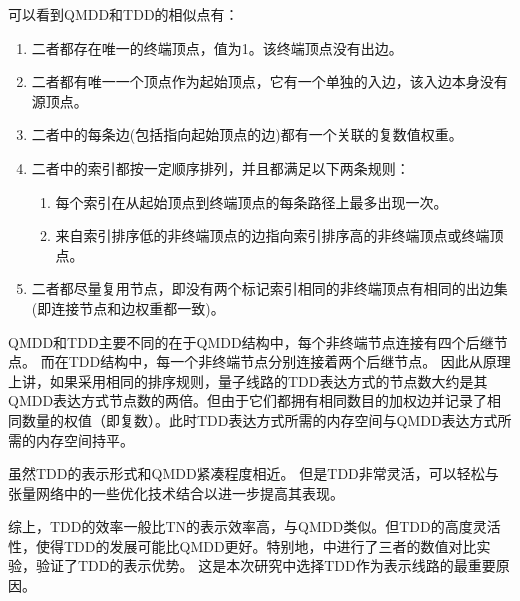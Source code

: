 可以看到QMDD和TDD的相似点有：
\begin{enumerate}
    \item 二者都存在唯一的终端顶点，值为1。该终端顶点没有出边。
    \item 二者都有唯一一个顶点作为起始顶点，它有一个单独的入边，该入边本身没有源顶点。
    \item 二者中的每条边(包括指向起始顶点的边)都有一个关联的复数值权重。
    \item 二者中的索引都按一定顺序排列，并且都满足以下两条规则：
    \begin{enumerate}[label=\roman*)]
        \item 每个索引在从起始顶点到终端顶点的每条路径上最多出现一次。
        \item 来自索引排序低的非终端顶点的边指向索引排序高的非终端顶点或终端顶点。
    \end{enumerate}
    \item 二者都尽量复用节点，即没有两个标记索引相同的非终端顶点有相同的出边集(即连接节点和边权重都一致)。
\end{enumerate}

QMDD和TDD主要不同的在于QMDD结构中，每个非终端节点连接有四个后继节点。
而在TDD结构中，每一个非终端节点分别连接着两个后继节点。
因此从原理上讲，如果采用相同的排序规则，量子线路的TDD表达方式的节点数大约是其QMDD表达方式节点数的两倍。但由于它们都拥有相同数目的加权边并记录了相同数量的权值（即复数）。此时TDD表达方式所需的内存空间与QMDD表达方式所需的内存空间持平。

虽然TDD的表示形式和QMDD紧凑程度相近。
但是TDD非常灵活，可以轻松与张量网络中的一些优化技术结合以进一步提高其表现。

综上，TDD的效率一般比TN的表示效率高，与QMDD类似。但TDD的高度灵活性，使得TDD的发展可能比QMDD更好。特别地，\cite{Hong_2022}中进行了三者的数值对比实验，验证了TDD的表示优势。
这是本次研究中选择TDD作为表示线路的最重要原因。

